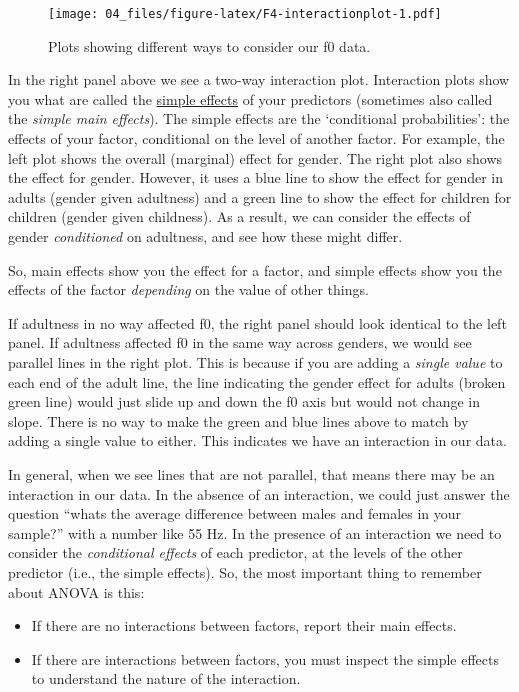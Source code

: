 \documentclass[
]{book}
\begin{document}
\begin{figure}
\centering
\texttt{[image: 04\_files/figure-latex/F4-interactionplot-1.pdf]}
\caption{\label{fig:F4-interactionplot}Plots showing different ways to consider our f0 data.}
\end{figure}

In the right panel above we see a two-way interaction plot. Interaction plots show you what are called the \href{http://glimo.vub.ac.be/downloads/simpleeffect.htm}{simple effects} of your predictors (sometimes also called the \emph{simple main effects}). The simple effects are the `conditional probabilities': the effects of your factor, conditional on the level of another factor. For example, the left plot shows the overall (marginal) effect for gender. The right plot also shows the effect for gender. However, it uses a blue line to show the effect for gender in adults (gender given adultness) and a green line to show the effect for children for children (gender given childness). As a result, we can consider the effects of gender \emph{conditioned} on adultness, and see how these might differ.

So, main effects show you the effect for a factor, and simple effects show you the effects of the factor \emph{depending} on the value of other things.

If adultness in no way affected f0, the right panel should look identical to the left panel. If adultness affected f0 in the same way across genders, we would see parallel lines in the right plot. This is because if you are adding a \emph{single value} to each end of the adult line, the line indicating the gender effect for adults (broken green line) would just slide up and down the f0 axis but would not change in slope. There is no way to make the green and blue lines above to match by adding a single value to either. This indicates we have an interaction in our data.

In general, when we see lines that are not parallel, that means there may be an interaction in our data. In the absence of an interaction, we could just answer the question ``whats the average difference between males and females in your sample?'' with a number like 55 Hz. In the presence of an interaction we need to consider the \emph{conditional effects} of each predictor, at the levels of the other predictor (i.e., the simple effects). So, the most important thing to remember about ANOVA is this:

\begin{itemize}
\item
  If there are no interactions between factors, report their main effects.
\item
  If there are interactions between factors, you must inspect the simple effects to understand the nature of the interaction.
\end{itemize}
\end{document}
